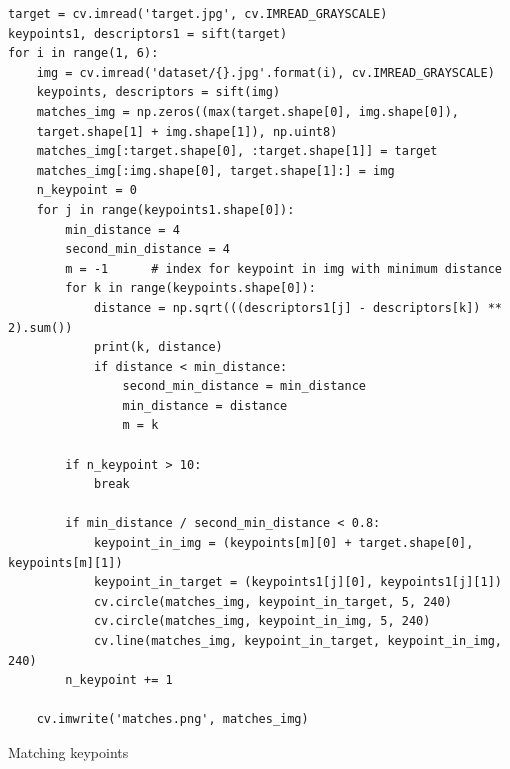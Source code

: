 \documentclass{ee208report}
\begin{document}
\begin{listing}
    \begin{verbatim}
target = cv.imread('target.jpg', cv.IMREAD_GRAYSCALE)
keypoints1, descriptors1 = sift(target)
for i in range(1, 6):
    img = cv.imread('dataset/{}.jpg'.format(i), cv.IMREAD_GRAYSCALE)
    keypoints, descriptors = sift(img)
    matches_img = np.zeros((max(target.shape[0], img.shape[0]),
    target.shape[1] + img.shape[1]), np.uint8)
    matches_img[:target.shape[0], :target.shape[1]] = target
    matches_img[:img.shape[0], target.shape[1]:] = img
    n_keypoint = 0
    for j in range(keypoints1.shape[0]):
        min_distance = 4
        second_min_distance = 4
        m = -1      # index for keypoint in img with minimum distance
        for k in range(keypoints.shape[0]):
            distance = np.sqrt(((descriptors1[j] - descriptors[k]) ** 2).sum())
            print(k, distance)
            if distance < min_distance:
                second_min_distance = min_distance
                min_distance = distance
                m = k
        
        if n_keypoint > 10:
            break
        
        if min_distance / second_min_distance < 0.8:
            keypoint_in_img = (keypoints[m][0] + target.shape[0], keypoints[m][1])
            keypoint_in_target = (keypoints1[j][0], keypoints1[j][1])
            cv.circle(matches_img, keypoint_in_target, 5, 240)
            cv.circle(matches_img, keypoint_in_img, 5, 240)
            cv.line(matches_img, keypoint_in_target, keypoint_in_img, 240)
        n_keypoint += 1

    cv.imwrite('matches.png', matches_img)
    \end{verbatim}
    \caption{Matching keypoints}
    \label{lst:keypoint-matching}
\end{listing}
\end{document}
